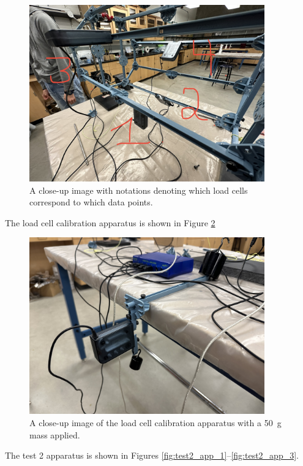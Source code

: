 \documentclass[12 pt]{report}
\begin{document}
\begin{figure}[htbp]
	\centering
	\includegraphics[width=4in]{images/IMG_1322}
	\caption{A close-up image with notations denoting which load cells correspond to which data points.}
	\label{fig:test1_app_11}
\end{figure}

The load cell calibration apparatus is shown in Figure \ref{fig:load_cell_calibration}

\begin{figure}[htbp]
	\centering
	\includegraphics[width=4in]{images/IMG_1323}
	\caption{A close-up image of the load cell calibration apparatus with a \qty{50}{\gram} mass applied.}
	\label{fig:load_cell_calibration}
\end{figure}

The test \num{2} apparatus is shown in Figures \ref{fig:test2_app_1}--\ref{fig:test2_app_3}.
\end{document}
